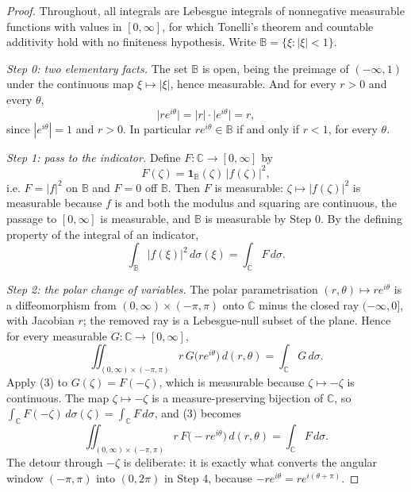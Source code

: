 \begin{proof}
Throughout, all integrals are Lebesgue integrals of nonnegative measurable
functions with values in $[0,\infty]$, for which Tonelli's theorem and
countable additivity hold with no finiteness hypothesis.  Write
$\mathbb{B}=\{\xi:|\xi|<1\}$.

\emph{Step 0: two elementary facts.}  The set $\mathbb{B}$ is open, being the
preimage of $(-\infty,1)$ under the continuous map $\xi\mapsto|\xi|$, hence
measurable.  And for every $r>0$ and every $\theta$,
\begin{equation}\tag{1}
  \bigl|re^{i\theta}\bigr|=|r|\cdot\bigl|e^{i\theta}\bigr|=r ,
\end{equation}
since $|e^{i\theta}|=1$ and $r>0$.  In particular $re^{i\theta}\in\mathbb{B}$
if and only if $r<1$, for every $\theta$.

\emph{Step 1: pass to the indicator.}  Define
$F\colon\mathbb{C}\to[0,\infty]$ by
\[
  F(\zeta)=\mathbf1_{\mathbb{B}}(\zeta)\,|f(\zeta)|^{2},
\]
i.e. $F=|f|^{2}$ on $\mathbb{B}$ and $F=0$ off $\mathbb{B}$.  Then $F$ is
measurable: $\zeta\mapsto|f(\zeta)|^{2}$ is measurable because $f$ is and both
the modulus and squaring are continuous, the passage to $[0,\infty]$ is
measurable, and $\mathbb{B}$ is measurable by Step 0.  By the defining
property of the integral of an indicator,
\begin{equation}\tag{2}
  \int_{\mathbb{B}}|f(\xi)|^{2}\,d\sigma(\xi)=\int_{\mathbb{C}}F\,d\sigma .
\end{equation}

\emph{Step 2: the polar change of variables.}  The polar parametrisation
$(r,\theta)\mapsto re^{i\theta}$ is a diffeomorphism from
$(0,\infty)\times(-\pi,\pi)$ onto $\mathbb{C}$ minus the closed ray
$(-\infty,0]$, with Jacobian $r$; the removed ray is a Lebesgue-null subset of
the plane.  Hence for every measurable $G\colon\mathbb{C}\to[0,\infty]$,
\begin{equation}\tag{3}
  \iint_{(0,\infty)\times(-\pi,\pi)}r\,G\bigl(re^{i\theta}\bigr)
    \,d(r,\theta)
  =\int_{\mathbb{C}}G\,d\sigma .
\end{equation}
Apply (3) to $G(\zeta)=F(-\zeta)$, which is measurable because
$\zeta\mapsto-\zeta$ is continuous.  The map $\zeta\mapsto-\zeta$ is a
measure-preserving bijection of $\mathbb{C}$, so
$\int_{\mathbb{C}}F(-\zeta)\,d\sigma(\zeta)=\int_{\mathbb{C}}F\,d\sigma$, and
(3) becomes
\begin{equation}\tag{4}
  \iint_{(0,\infty)\times(-\pi,\pi)}r\,F\bigl(-re^{i\theta}\bigr)
    \,d(r,\theta)
  =\int_{\mathbb{C}}F\,d\sigma .
\end{equation}
The detour through $-\zeta$ is deliberate: it is exactly what converts the
angular window $(-\pi,\pi)$ into $(0,2\pi)$ in Step 4, because
$-re^{i\theta}=re^{i(\theta+\pi)}$.


\end{proof}
